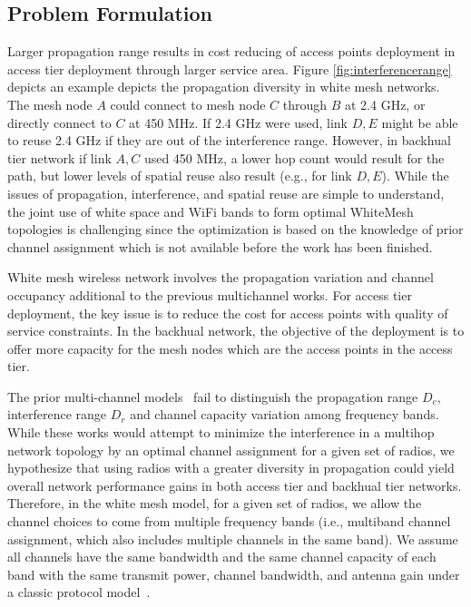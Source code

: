 \subsection{Problem Formulation}
\label{subsec:problem}
Larger propagation range results in cost reducing of access points deployment in access 
tier deployment through larger service area. Figure \ref{fig:interferencerange} depicts 
an example depicts the propagation diversity in white mesh networks. The mesh node $A$ 
could connect to mesh node $C$ through $B$ at 2.4 GHz, or directly connect to $C$ at 450 
MHz. If 2.4 GHz were used, link $D,E$ might be able to reuse 2.4 GHz if they are out of 
the interference range. However, in backhual tier network if link $A,C$ used 450 MHz, a 
lower hop count would result for the path, but lower levels of spatial reuse also result 
(e.g., for link $D,E$). While the issues of propagation, interference, and spatial reuse are 
simple to understand, the joint use of white space and WiFi bands to form optimal WhiteMesh 
topologies is challenging since the optimization is based on the knowledge of prior channel 
assignment which is not available before the work has been finished.


White mesh wireless network involves the propagation variation and channel occupancy additional to 
the previous multichannel works. For access tier deployment, the key issue is to reduce the cost
for access points with quality of service constraints. In the backhual network, the objective of 
the deployment is to offer more capacity for the mesh nodes which are the access points in the 
access tier. 

The prior multi-channel models~\cite{tang2005interference, doraghinejad2014channel} fail to 
distinguish the propagation range $D_c$, interference range $D_r$ and channel capacity variation 
among frequency bands. While these works would attempt to minimize the interference in a multihop 
network topology by an optimal channel assignment for a given set of radios, we hypothesize that
using radios with a greater diversity in propagation could yield overall network performance gains
in both access tier and backhual tier networks. Therefore, in the white mesh model, for a given set 
of radios, we allow the channel choices to come from multiple frequency bands (i.e., multiband channel 
assignment, which also includes multiple channels in the same band). We assume all channels have 
the same bandwidth and the same channel capacity of each band with the same transmit power, channel 
bandwidth, and antenna gain under a classic protocol model~\cite{gupta2000capacity}. 


